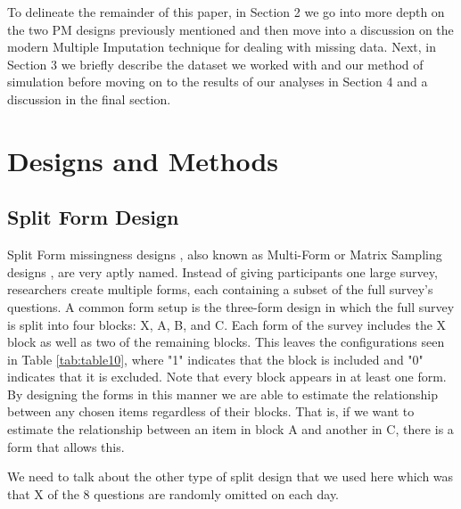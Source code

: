\documentclass{svjour3}                     %
\begin{document}
To delineate the remainder of this paper, in Section 2 we go into more depth on the two PM designs previously mentioned and then move into a discussion on the modern Multiple Imputation technique for dealing with missing data. Next, in Section 3 we briefly describe the dataset we worked with and our method of simulation before moving on to the results of our analyses in Section 4 and a discussion in the final section. \par


\section{Designs and Methods}
\label{sec:1}
\subsection{Split Form Design}
\label{sec:1.1}

Split Form missingness designs \citep{raghunathan1995split}, also  known as Multi-Form \citep{little2013planned} or Matrix Sampling designs \citep{thomas2006evaluation}, are very aptly named. Instead of giving participants one large survey, researchers create multiple forms, each containing a subset of the full survey's questions. A common form setup is the three-form design \citep{graham1996maximizing} in which the full survey is split into four blocks: X, A, B, and C. Each form of the survey includes the X block as well as two of the remaining blocks. This leaves the configurations seen in Table \ref{tab:table10}, where "1" indicates that the block is included and "0" indicates that it is excluded. Note that every block appears in at least one form. By designing the forms in this manner we are able to estimate the relationship between any chosen items regardless of their blocks. That is, if we want to estimate the relationship between an item in block A and another in C, there is a form that allows this. \par

We need to talk about the other type of split design that we used here which was that X of the 8 questions are randomly omitted on each day.  

\end{document}
